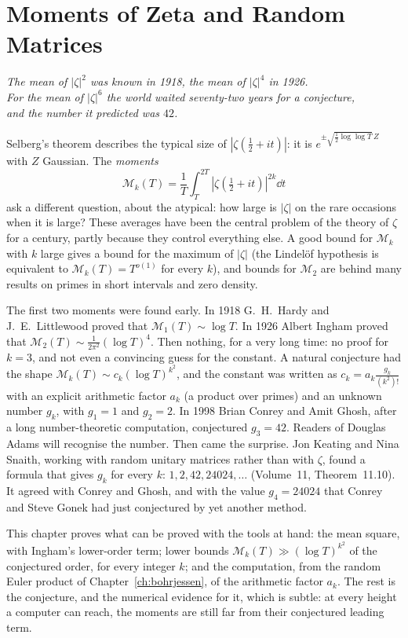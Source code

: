 \chapter{Moments of Zeta and Random Matrices}\label{ch:moments}
\begin{center}\itshape
The mean of $|\zeta|^2$ was known in 1918, the mean of $|\zeta|^4$ in 1926.\\
For the mean of $|\zeta|^6$ the world waited seventy-two years for a conjecture,\\
and the number it predicted was $42$.
\end{center}

Selberg's theorem describes the typical size of $|\zeta(\frac12+it)|$: it is $e^{\pm\sqrt{\frac12\log\log T}\,Z}$ with $Z$ Gaussian. The \emph{moments}
\[
\mathcal M_k(T)=\frac1T\int_T^{2T}|\zeta(\tfrac12+it)|^{2k}\dd t
\]
ask a different question, about the atypical: how large is $|\zeta|$ on the rare occasions when it is large? These averages have been the central problem of the theory of $\zeta$ for a century, partly because they control everything else. A good bound for $\mathcal M_k$ with $k$ large gives a bound for the maximum of $|\zeta|$ (the Lindelöf hypothesis is equivalent to $\mathcal M_k(T)=T^{o(1)}$ for every $k$), and bounds for $\mathcal M_2$ are behind many results on primes in short intervals and zero density.

The first two moments were found early. In 1918 G.~H.~Hardy and J.~E.~Littlewood proved that $\mathcal M_1(T)\sim\log T$. In 1926 Albert Ingham proved that $\mathcal M_2(T)\sim\frac1{2\pi^2}(\log T)^4$. Then nothing, for a very long time: no proof for $k=3$, and not even a convincing guess for the constant. A natural conjecture had the shape $\mathcal M_k(T)\sim c_k(\log T)^{k^2}$, and the constant was written as $c_k=a_k\frac{g_k}{(k^2)!}$ with an explicit arithmetic factor $a_k$ (a product over primes) and an unknown number $g_k$, with $g_1=1$ and $g_2=2$. In 1998 Brian Conrey and Amit Ghosh, after a long number-theoretic computation, conjectured $g_3=42$. Readers of Douglas Adams will recognise the number. Then came the surprise. Jon Keating and Nina Snaith, working with random unitary matrices rather than with $\zeta$, found a formula that gives $g_k$ for every $k$: $1,2,42,24024,\dots$ (Volume~11, Theorem~11.10). It agreed with Conrey and Ghosh, and with the value $g_4=24024$ that Conrey and Steve Gonek had just conjectured by yet another method.

This chapter proves what can be proved with the tools at hand: the mean square, with Ingham's lower-order term; lower bounds $\mathcal M_k(T)\gg(\log T)^{k^2}$ of the conjectured order, for every integer $k$; and the computation, from the random Euler product of Chapter~\ref{ch:bohrjessen}, of the arithmetic factor $a_k$. The rest is the conjecture, and the numerical evidence for it, which is subtle: at every height a computer can reach, the moments are still far from their conjectured leading term.

